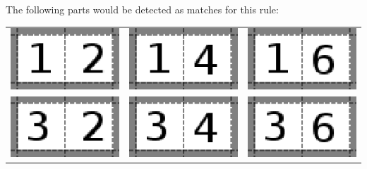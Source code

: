 The following parts would be detected as matches for this rule:
\begin{table}[h!]
        \begin{tabular}{c c c}
		\includegraphics[scale=1]{Example/AbstractInput/12.eps} & \includegraphics[scale=1]{Example/AbstractInput/14.eps} & \includegraphics[scale=1]{Example/AbstractInput/16.eps} \\
		\includegraphics[scale=1]{Example/AbstractInput/32.eps} & \includegraphics[scale=1]{Example/AbstractInput/34.eps} & \includegraphics[scale=1]{Example/AbstractInput/36.eps} \\

\end{tabular}
\end{table}
